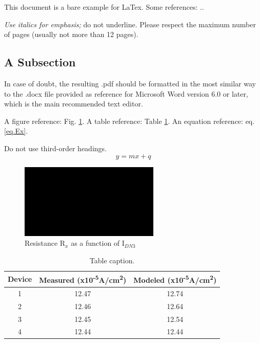 \documentclass[a4paper,10pt,twoside,twocolumn,final]{JICS_LaTexGuidelines} %
\begin{document}
	This document is a bare example for LaTex. Some references: \cite{shell_how_2015}.\cite{lamport_standard_2014}.
	
	\textit{Use italics for emphasis;} do not underline. Please respect the maximum number of pages (usually not more than 12 pages). 
	
\subsection{A Subsection}
	In case of doubt, the resulting .pdf should be formatted in the most similar way to the .docx file provided as reference for Microsoft Word version 6.0 or later, which is the main recommended text editor.
	
	A figure reference: Fig. \ref{fig.example}. A table reference: Table \ref{table.Ex}. An equation reference: eq. \ref{eq.Ex}.
	
	Do not use third-order headings.%
\begin{equation}
\label{eq.Ex}
y=mx + q
\end{equation} %
\begin{figure}[h!]
	\includegraphics[width=\columnwidth]{FIGURA.png}
	\caption{Resistance R$_{x}$ as a function of I$_{DN3}$}
	\label{fig.example}
\end{figure}
\begin{table}[h]\tiny
	\centering
	\caption{Table caption.}
	\label{table.Ex}
	\begin{tabular}{c c c}	
		\hline	
		Device& Measured (x10\textsuperscript{-5}A/cm\textsuperscript{2})& Modeled (x10\textsuperscript{-5}A/cm\textsuperscript{2})\\
		\hline
		1&12.47&12.74\\
		2&12.46&12.64\\
		3&12.45&12.54\\
		4&12.44&12.44\\
		\hline
	\end{tabular}
\end{table}
\end{document}
